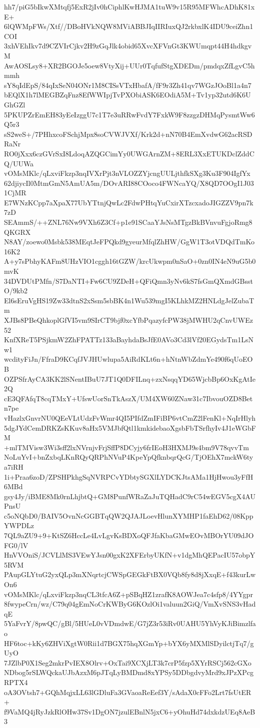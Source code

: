 hh7/piG5bIkwXMtqfj5ExR2jIv0hCiphlKwHJMA1tuW9v15R95MFWhcADhK81xE+
6lQWMpFWs/Xtf//DBoHVkNQW8MViABBJIqIIRIuxQJ2rkbxlK4IDU9ceiZhn1COI
3xhVEhIkv7d9CZVIrCjkv2H9zGqJlk4obid65XvcXFVnGt3KWUmqpt44H4hdkgvM
AwAOSLsy8+XR2BGOJe5oew8VtyXij+UUr0TqfufStgXDEDm/pmdqxZfLgvC5hmmh
sY8qIdEpS/84qIxSeN04ONr1M8CISsVTxHbafA/fF9r3Zh41qv7WGzJOoBl1a4n7
bEQlX1h7lMEGBZqFnz8EfWWIpjTvPXObiASK6EOdiA5M+Tv1yp32utd6K6UGhGZl
5PKUPZrEmEH83yEeIzggU7c1T7e3uRRwFvdY7FxkW9F8zzgzDHMqPysmtWw6Q5r3
sS2weS+/7PHhxcoFSchjMpx8soCVWJVXf/Krk2d+nN70B4EmXvdwG62acRSDRaNr
RO0jXxx6czGVrSxI8LdoqAZQGCimYy0UWGArnZM+8ERL3XxETUKDclZddCQ/UUWa
vOMsMKlc/qLxviFkzp3nqIVXrPjt3nVLOZZYjcngUULjthfkSXg3Ku3F904IgfYx
62djiycIl0MtmGmN5AmUA5m/DOvARI88COoco4FWNcaYQ/X8QD7OOgI1J031CjMR
E7WNzKCpp7aXpaX77UbYTtnjQwLc2FdwPHtqYuCxirXTzcxadoJIGZZV9pn7k7zD
SEAmmS/++ZNL76Nw9VXh6Z3Cf+p1e91SCaaYJsNsMTgzBkBVnvuFgjoRmg8QKGRX
N8AY/zoewo0Msbk538MEqtJeFPQkd9gyeurMfqlZhHW/GgW1T3otVDQdTmKo16K2
A+y7sPbhyKAFm8UHzVIO1cggh16tGZW/krcUkwpm0nSaO+0zn0IN4eN9uG5b0mvK
34DVDUtPMfn/S7DaNTI+Fw6CU9ZDeH+QFiQmn3yNv6kS7fsGmQXmdGBsstO/9kb2
El6sEruVgHS19Zw33dtnS2xSsm5sbBK4n1Wu539mgI5KLhkMZ2HNLdgJelZubaTm
XJBs8PBeQhkoplGfVI5vm9SIrCT9bjf0xcYfbPqazyfcPW38jMWHU2qCnvUWEz52
KnfXReT5PSjkmW2ZhFPATTz133aBayhdaBsJfE0AVo3Cd3lVf20EGydsTm1LsNw1
wcdityFiJn/FfraD9KCqfJVJHUwlupa5AiRdKLt6n+hNtnWbZdmYe490f6qUoEOB
OZPSfrAyCA3KK2lSNentIBuU7JT1Q0DFILnq+zxNsqqYD65WjcbBp6OxKgAtIe2Q
cE3QFAfqT8cqTMxY+UfswUorSnTkAszX/UM4XW60ZNaw31c7IbvouOZD8Betn7pe
vHazlxGnvrNU0QEeVLtUdzFvWmr4QI5PIfdZmIFiBP6vtCmZ2lFenKl+NqIrHlyh
5dgJYdCemDRKZsKKuv8aHx5VMJbfQtl1kmkidebaoXgsbFbTSrfhyIv4J1eWGbFM
+mlTMVisw3Wi3sff2lxNVrnjvFrjSffP8DCyjy6frIEoH3HXMJ9s4bm9V78qvvTm
NoLuYvI+bnZxbqLKnRQyQRPhNVuP4KpeYpQfknbqrQcG/TjOEhX7mckW6tya7iRH
1i+Praa6zoD/ZPSHPkhgSqNVRPCvYDbtySGXlLYDCKJtsAMa1HjHwou3yFfH6MBd
gsy4Jy/iBME8Mk0rnLhjbtQ+GM8PunfWRaZaJuTQHadC9rC54wEGV5cgX4AUPnsU
c5oNQbD0/BAIV5OvnNcGGBTqQW2QJAJLoevHlunXYMHP1faEhD62/08KppYWPDLz
7QL9aZU9+9+KtSZ6HccLe4LvLgvKsBDXoQFJfaKbaGMwEOvMBOrYU09dJOFG0/lV
HnVVOniS/JCVLlMS3VEwYJsn00gxK2XFErbyUKfN+v1dgMhQEPacIU57obpY5RVM
PAupGLYtuG2yxQLp3mXNqrtcjCWSpGEGkFtBX0VQb8fy8d8jXxqE+f43kurLwOn6
vOMsMKlc/qLxviFkzp3nqCL3tfcA6Z+pSBqHZ1zrafK8AOWJea7c4sfp8/4YYgpr
8fwypeCrn/wz/C79q04gEmNoCrKWByG6KOzlOi1valuun2GiQ/VmXvSNS3vHadqE
5YaFvrY/8pwQC/gBl/5HUeL0vVDmdwE/G7jZ3r53iRv0UAHU5YhVyKJiBimzlfao
HF6toc+kKy6ZHViXgtW0Rii1d7BGX75hqXGmYp+bYX6yMXMlSDyilctjTq7/gUyO
7JZlbP0X1Seg2mkrPvIEX8Olrv+OxTai9XCXjLT3k7crP5fzp5XYrRSCj562cGXo
NDbog5rSLWQckaUJbAzxM6pJTqLyBMDmd8xYPSy5DDbgdvyMrd9xJPzXPcgRPTX4
oA3OVtsh7+GQhMqjxLL63lGDluFa3GVaoaReEef3Y/sAdaX0cFFo2Lrt7fsUtER+
f9VaMQ4jRyJzkRlOHw37Sv1DgON7jzulEBnlN5jxC6+yOhuHd74dxkdzUEq8AeB3
